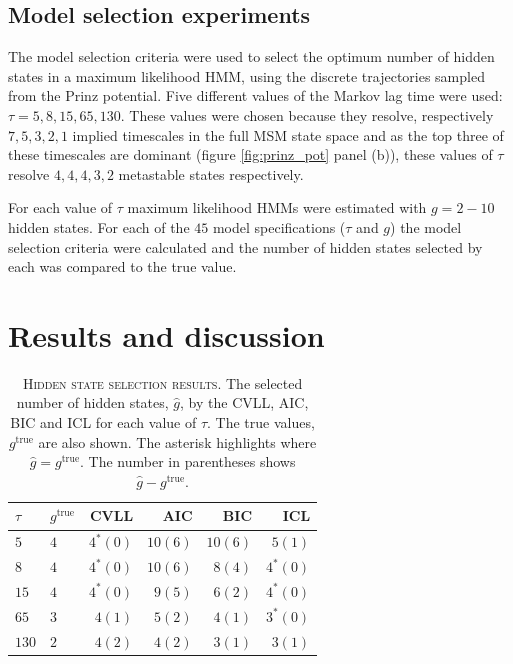 \subsection{Model selection experiments}
The model selection criteria were used to select the optimum number of hidden states in a maximum likelihood HMM, using the discrete trajectories sampled from the Prinz potential. Five different values of the Markov lag time were used: $\tau=5, 8, 15, 65, 130$. These values were chosen because they resolve, respectively $7, 5, 3, 2, 1$ implied timescales in the full MSM state space and as the top three of these timescales are dominant (figure \ref{fig:prinz_pot} panel (b)), these values of $\tau$ resolve $4, 4, 4, 3, 2$ metastable states  respectively\cite{noeProjectedHiddenMarkov2013a}.

For each value of $\tau$ maximum likelihood HMMs were estimated with $g = 2 - 10$ hidden states. For each of the $45$ model specifications ($\tau$ and $g$) the model selection criteria were calculated  and the number of hidden states selected by each was compared to the true value. 

\section{Results and discussion}\label{sec:hmm_results}
\begin{table}
    \centering
    \caption[Hidden state selection results]{\textsc{Hidden state selection results}. The selected number of hidden states, $\hat{g}$, by the CVLL, AIC, BIC and ICL for each value of $\tau$. The true values, $g^{\mathrm{true}}$ are also shown. The asterisk highlights where $\hat{g}=g^{\mathrm{true}}$. The number in parentheses shows $\hat{g}-g^{\mathrm{true}}$. }
    \begin{tabular}{llrrrr}
    \toprule
    $\tau$ & $g^{\mathrm{true}}$ & CVLL & AIC & BIC & ICL  \\
    \midrule
     $5$  & $4$ & $4^{*} (0)$  & $10 (6)$ & $10 (6)$ & $5 (1)$ \\
     $8$  & $4$ & $4^{*} (0)$ & $10 (6)$ & $8 (4)$  & $4^{*} (0)$  \\
     $15$ & $4$ & $4^{*} (0)$  & $9 (5)$ & $6 (2)$  & $4^{*} (0)$  \\
     $65 $& $3$ & $4 (1)$  & $5 (2)$  & $4 (1)$  & $3^{*} (0)$  \\
     $130$& $2$ & $4 (2)$  & $4 (2)$  & $3 (1)$  & $3 (1)$  \\
     \bottomrule
    \end{tabular}
    \label{tab:prinz_criteria_results}
\end{table}

